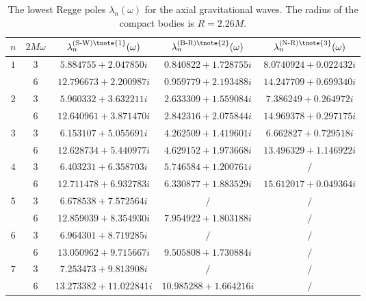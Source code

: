 \documentclass[aps,prd,longbibliography,reprint,twocolumn,amsmath,amssymb,amsfonts,showpacs,footnote,superscriptaddress]{revtex4-1}%
\begin{document}
\begingroup
\squeezetable
\begin{table}[htp]
\fontsize{5.}{10}
\begin{threeparttable}[htp]
\captionsetup{font=small}
\caption{\label{tab:table4} The lowest Regge poles $\lambda_{n}(\omega)$ for the axial gravitational waves. The radius of the compact bodies is $R = 2.26M$.}
\smallskip
\centering
\begin{ruledtabular}
\begin{tabular}{ccccc}
 $n$ & $2M\omega$  & $\lambda^{\text{(S-W)\tnote{1}}}_n(\omega)$  & $\lambda^{\text{(B-R)\tnote{2}}}_n(\omega)$ & $\lambda^{\text{(N-R)\tnote{3}}}_n(\omega)$
 \\ \hline
$1$  & $3$  & $5.884755+2.047850 i $  & $0.840822+1.728755 i   $  & $8.0740924+0.022432 i   $   \\
     & $6$  & $12.796673+2.200987 i  $  & $0.959779+2.193488 i   $  & $14.247709+0.699340 i  $    \\

$2$  & $3$  & $5.960332+3.632211 i   $  & $2.633309+1.559084 i   $  & $7.386249+0.264972 i   $  \\
     & $6$  & $12.640961+3.871470 i  $  & $2.842316+2.075844 i  $  & $14.969378+0.297175 i  $  \\

$3$  & $3$  & $6.153107+5.055691 i   $  & $4.262509+1.419601 i   $  & $6.662827+0.729518 i  $   \\
     & $6$  & $ 12.628734+5.440977 i$  & $4.629152+1.973668 i  $  & $13.496329+1.146922 i  $  \\

$4$  & $3$  & $6.403231+6.358703 i  $  & $ 5.746584+1.200761 i$  & $/ $   \\
     & $6$  & $12.711478+6.932783 i  $  & $6.330877+1.883529 i  $  & $15.612017+0.049364 i  $   \\

$5$  & $3$  & $6.678538+7.572564 i $  & $ /$  & $/ $   \\
     & $6$  & $12.859039+8.354930 i   $  & $7.954922+1.803188 i    $  & $ /$  \\

$6$  & $3$  & $6.964301+8.719285 i  $  & $/ $  & $ /$  \\
     & $6$  & $13.050962+9.715667 i  $  & $9.505808+1.730884 i  $  & $/ $   \\

$7$  & $3$  & $7.253473+9.813908 i   $  & $ /$  & $/ $  \\
     & $6$  & $13.273382+11.022841 i  $  & $10.985288+1.664216 i   $  & $ /$   \\


\end{tabular}
\end{ruledtabular}
\end{threeparttable}
\end{table}
\end{document}
